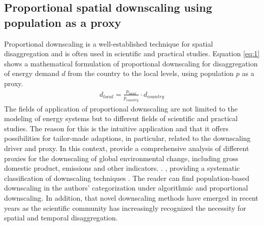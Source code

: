 \subsection{Proportional spatial downscaling using population as a proxy}\label{pop}
Proportional downscaling is a well-established technique for spatial disaggregation and is often used in scientific and practical studies. Equation \ref{eq:1} shows a mathematical formulation of proportional downscaling for disaggregation of energy demand $d$ from the country to the local levels, using population $p$ as a proxy.
\begin{align}\label{eq:1}
d_{local}=\frac{p_{local}}{p_{country}} \cdot d_{country}
\end{align}
The fields of application of proportional downscaling are not limited to the modeling of energy systems but to different fields of scientific and practical studies. The reason for this is the intuitive application and that it offers possibilities for tailor-made adaptions, in particular, related to the downscaling driver and proxy. In this context,  provide a comprehensive analysis of different proxies for the downscaling of global environmental change, including gross domestic product, emissions and other indicators. .   \cite{van2010downscaling}, providing a systematic classification of  downscaling techniques . The reader can find population-based downscaling in the authors' categorization under algorithmic and proportional downscaling. In addition,  that novel downscaling methods have emerged in recent years as the scientific community has increasingly recognized the necessity for spatial and temporal disaggregation.

